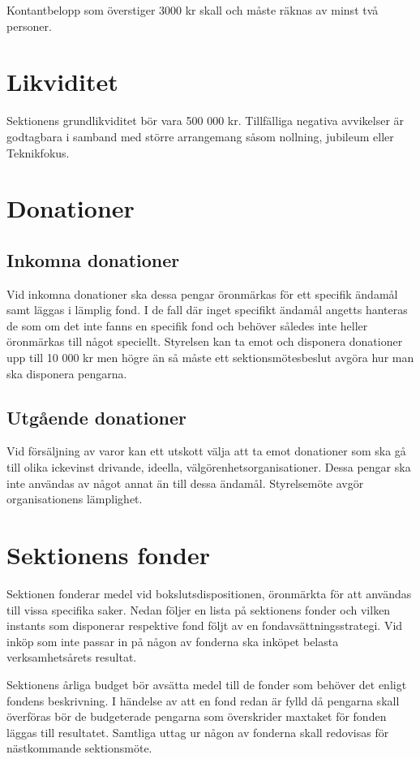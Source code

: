 \documentclass{dsekprotokoll}
\begin{document}
Kontantbelopp som överstiger 3000 kr skall och måste räknas av minst två
personer.

\section{Likviditet}
Sektionens grundlikviditet bör vara 500 000 kr. Tillfälliga negativa avvikelser
är godtagbara i samband med större arrangemang såsom nollning, jubileum eller
Teknikfokus.

\section{Donationer}

\subsection{Inkomna donationer}
Vid inkomna donationer ska dessa pengar öronmärkas för ett specifik ändamål samt
läggas i lämplig fond. I de fall där inget specifikt ändamål angetts hanteras de
som om det inte fanns en specifik fond och behöver således inte heller
öronmärkas till något speciellt.  Styrelsen kan ta emot och disponera donationer
upp till 10 000 kr men högre än så måste ett sektionsmötesbeslut avgöra hur man
ska disponera pengarna.

\subsection{Utgående donationer}
Vid försäljning av varor kan ett utskott välja att ta emot donationer som ska gå
till olika ickevinst drivande, ideella, välgörenhetsorganisationer. Dessa
pengar ska inte användas av något annat än till dessa ändamål. Styrelsemöte
avgör organisationens lämplighet.

\section{Sektionens fonder}
Sektionen fonderar medel vid bokslutsdispositionen, öronmärkta för att användas
till vissa specifika saker. Nedan följer en lista på sektionens fonder och
vilken instants som disponerar respektive fond följt av en
fondavsättningsstrategi. Vid inköp som inte passar in på någon av fonderna ska
inköpet belasta verksamhetsårets resultat.

Sektionens årliga budget bör avsätta medel till de fonder som behöver det enligt
fondens beskrivning. I händelse av att en fond redan är fylld då pengarna
skall överföras bör de budgeterade pengarna som överskrider maxtaket för
fonden läggas till resultatet. Samtliga uttag ur någon av fonderna skall
redovisas för nästkommande sektionsmöte.
\end{document}
